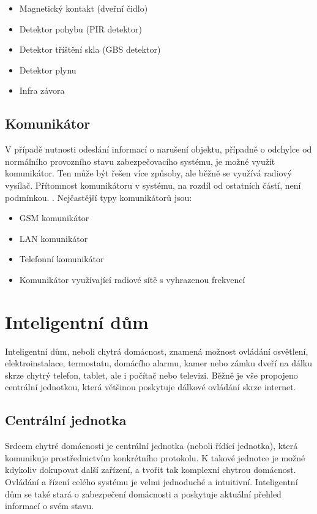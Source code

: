 \documentclass[FM,DP]{tulthesis}  %
\begin{document}
\begin{itemize}
\item Magnetický kontakt (dveřní čidlo)
\item Detektor pohybu (PIR detektor)
\item Detektor tříštění skla (GBS detektor)
\item Detektor plynu
\item Infra závora
\end{itemize}

\subsection{Komunikátor}
V případě nutnosti odeslání informací o narušení objektu, případně o odchylce od normálního provozního stavu zabezpečovacího systému, je možné využít komunikátor. Ten může být řešen více způsoby, ale běžně se využívá radiový vysílač. Přítomnost komunikátoru v systému, na rozdíl od ostatních částí, není podmínkou. \cite{Electronic security signalisation}. Nejčastější typy komunikátorů jsou:

\begin{itemize}
\item GSM komunikátor
\item LAN komunikátor
\item Telefonní komunikátor
\item Komunikátor využívající radiové sítě s vyhrazenou frekvencí
\end{itemize}


\section{Inteligentní dům}
Inteligentní dům, neboli chytrá domácnost, znamená možnost ovládání osvětlení, elektroinstalace, termostatu, domácího alarmu, kamer nebo zámku dveří na dálku skrze chytrý telefon, tablet, ale i počítač nebo televizi. Běžně je vše propojeno centrální jednotkou, která většinou poskytuje dálkové ovládání skrze internet.

\subsection{Centrální jednotka}
Srdcem chytré domácnosti je centrální jednotka (neboli řídící jednotka), která komunikuje prostřednictvím konkrétního protokolu. K takové jednotce je možné kdykoliv dokupovat další zařízení, a tvořit tak komplexní chytrou domácnost. Ovládání a řízení celého systému je velmi jednoduché a intuitivní. Inteligentní dům se také stará o zabezpečení domácnosti a poskytuje aktuální přehled informací o svém stavu.
\end{document}
